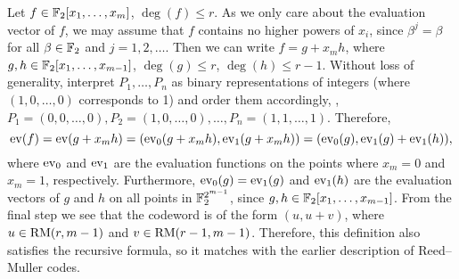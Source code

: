 \documentclass[../main.tex]{subfiles}
\begin{document}
Let $f \in \mathbb{F}_2[x_1, \dots, x_m]$, $\deg(f) \leq r$. As we only care about the evaluation vector of $f$, we may assume that $f$ contains no higher powers of $x_i$, since $\beta^j = \beta$ for all $\beta \in \mathbb{F}_2$ and $j = 1, 2, \dots$. Then we can write $f = g + x_m h$, where $g, h \in \mathbb{F}_2[x_1, \dots, x_{m-1}]$, $\deg(g) \leq r$, $\deg(h) \leq r - 1$. Without loss of generality, interpret $P_1, \dots, P_n$ as binary representations of integers (where $(1, 0, \dots, 0)$ corresponds to 1) and order them accordingly, \ie, $P_1 = (0, 0, \dots, 0), P_2 = (1, 0, \dots, 0), \dots, P_n = (1, 1, \dots, 1)$. Therefore,
\begin{equation*}
    \operatorname{ev}(f) = \operatorname{ev}(g + x_m h) = (\operatorname{ev}_0(g + x_m h), \operatorname{ev}_1(g + x_m h)) = (\operatorname{ev}_0(g), \operatorname{ev}_1(g) + \operatorname{ev}_1(h)),
\end{equation*}
where $\operatorname{ev}_0$ and $\operatorname{ev}_1$ are the evaluation functions on the points where $x_m = 0$ and $x_m = 1$, respectively. Furthermore, $\operatorname{ev}_0(g) = \operatorname{ev}_1(g)$ and $\operatorname{ev}_1(h)$ are the evaluation vectors of $g$ and $h$ on all points in $\mathbb{F}_2^{2^{m-1}}$, since $g, h \in \mathbb{F}_2[x_1, \dots, x_{m-1}]$. From the final step we see that the codeword is of the form $(u, u + v)$, where $u \in \operatorname{RM}(r, m - 1)$ and $v \in \operatorname{RM}(r-1, m-1)$. Therefore, this definition also satisfies the recursive formula, so it matches with the earlier description of Reed--Muller codes.
\end{document}

